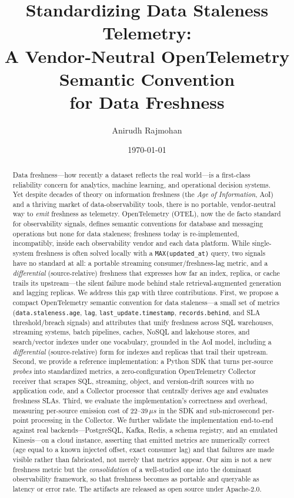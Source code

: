 \documentclass[11pt]{article}
\title{\textbf{Standardizing Data Staleness Telemetry:\\
A Vendor-Neutral OpenTelemetry Semantic Convention\\
for Data Freshness}}
\author{Anirudh Rajmohan}
\date{\today}
\begin{document}
\maketitle

\begin{abstract}
Data freshness---how recently a dataset reflects the real world---is a
first-class reliability concern for analytics, machine learning, and
operational decision systems. Yet despite decades of theory on information
freshness (the \emph{Age of Information}, AoI) and a thriving market of
data-observability tools, there is no portable, vendor-neutral way to
\emph{emit} freshness as telemetry. OpenTelemetry (OTEL), now the de facto
standard for observability signals, defines semantic conventions for database
and messaging operations but none for data staleness; freshness today is
re-implemented, incompatibly, inside each observability vendor and each data
platform. While single-system freshness is often solved locally with a
\texttt{MAX(updated\_at)} query, two signals have no standard at all: a portable
streaming consumer/freshness-lag metric, and a \emph{differential}
(source-relative) freshness that expresses how far an index, replica, or cache
trails its upstream---the silent failure mode behind stale retrieval-augmented
generation and lagging replicas. We address this gap with three contributions. First, we propose a
compact OpenTelemetry semantic convention for data staleness---a small set of
metrics (\texttt{data.staleness.age}, \texttt{lag},
\texttt{last\_update.timestamp}, \texttt{records.behind}, and SLA
threshold/breach signals) and attributes that
unify freshness across SQL warehouses, streaming systems, batch pipelines,
caches, NoSQL and lakehouse stores, and search/vector indexes under one
vocabulary, grounded in the AoI model, including a \emph{differential}
(source-relative) form for indexes and replicas that trail their upstream.
Second, we provide a
reference implementation: a Python SDK that turns per-source \emph{probes} into
standardized metrics, a zero-configuration OpenTelemetry Collector receiver that
scrapes SQL, streaming, object, and version-drift sources with no application
code, and a Collector processor that centrally derives age and evaluates
freshness SLAs. Third, we evaluate the
implementation's correctness and overhead, measuring per-source emission cost
of \(22\)--\(39\,\mu s\) in the SDK and sub-microsecond per-point processing in
the Collector. We further validate the implementation end-to-end against real
backends---PostgreSQL, Kafka, Redis, a schema registry, and an emulated
Kinesis---on a cloud instance, asserting that emitted metrics are numerically
correct (age equal to a known injected offset, exact consumer lag) and that
failures are made visible rather than fabricated, not merely that metrics
appear. Our aim is not a new freshness metric but the
\emph{consolidation} of a well-studied one into the dominant observability
framework, so that freshness becomes as portable and queryable as latency or
error rate. The artifacts are released as open source under Apache-2.0.
\end{abstract}
\end{document}
